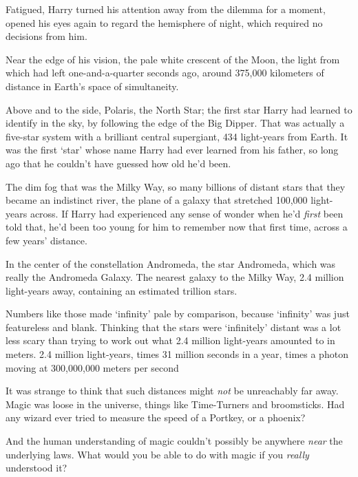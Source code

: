 Fatigued, Harry turned his attention away from the dilemma for a moment, opened
his eyes again to regard the hemisphere of night, which required no decisions
from him.

Near the edge of his vision, the pale white crescent of the Moon, the light
from which had left one-and-a-quarter seconds ago, around 375,000 kilometers of
distance in Earth's space of simultaneity.

Above and to the side, Polaris, the North Star; the first star Harry had
learned to identify in the sky, by following the edge of the Big Dipper. That
was actually a five-star system with a brilliant central supergiant, 434
light-years from Earth. It was the first `star' whose name Harry had ever
learned from his father, so long ago that he couldn't have guessed how old he'd
been.

The dim fog that was the Milky Way, so many billions of distant stars that they
became an indistinct river, the plane of a galaxy that stretched 100,000
light-years across. If Harry had experienced any sense of wonder when he'd
\emph{first} been told that, he'd been too young for him to remember now that
first time, across a few years' distance.

In the center of the constellation Andromeda, the star Andromeda, which was
really the Andromeda Galaxy. The nearest galaxy to the Milky Way, 2.4 million
light-years away, containing an estimated trillion stars.

Numbers like those made `infinity' pale by comparison, because `infinity' was
just featureless and blank. Thinking that the stars were `infinitely' distant
was a lot less scary than trying to work out what 2.4 million light-years
amounted to in meters. 2.4 million light-years, times 31 million seconds in a
year, times a photon moving at 300,000,000 meters per second{\el}

It was strange to think that such distances might \emph{not} be unreachably far
away. Magic was loose in the universe, things like Time-Turners and
broomsticks. Had any wizard ever tried to measure the speed of a Portkey, or a
phoenix?

And the human understanding of magic couldn't possibly be anywhere \emph{near}
the underlying laws. What would you be able to do with magic if you
\emph{really} understood it?


